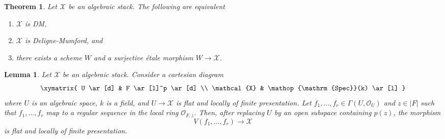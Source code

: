 \documentclass[10pt,a4paper]{amsart}
\theoremstyle{plain}
\newtheorem{theorem}[subsection]{Theorem}
\newtheorem{lemma}[subsection]{Lemma}
\theoremstyle{definition}
\theoremstyle{remark}
\numberwithin{equation}{subsection}
\def\Spec{\mathop{\mathrm{Spec}}}
\begin{document}
\begin{theorem}
\label{theorem-DM}
Let $\mathcal{X}$ be an algebraic stack. The following are equivalent
\begin{enumerate}
\item $\mathcal{X}$ is DM,
\item $\mathcal{X}$ is Deligne-Mumford, and
\item there exists a scheme $W$ and a surjective \'etale
morphism $W \to \mathcal{X}$.
\end{enumerate}
\end{theorem}

\begin{lemma}
\label{lemma-slice}
Let $\mathcal{X}$ be an algebraic stack.
Consider a cartesian diagram
$$
\xymatrix{
U \ar[d] & F \ar[l]^p \ar[d] \\
\mathcal{X} & \Spec(k) \ar[l]
}
$$
where $U$ is an algebraic space, $k$ is a field, and $U \to \mathcal{X}$
is flat and locally of finite presentation. Let
$f_1, \ldots, f_r \in \Gamma(U, \mathcal{O}_U)$
and $z \in |F|$ such that $f_1, \ldots, f_r$ map to a regular sequence
in the local ring $\mathcal{O}_{F, \overline{z}}$.
Then, after replacing $U$ by an open subspace containing $p(z)$, the morphism
$$
V(f_1, \ldots, f_r) \longrightarrow \mathcal{X}
$$
is flat and locally of finite presentation.
\end{lemma}
\end{document}
